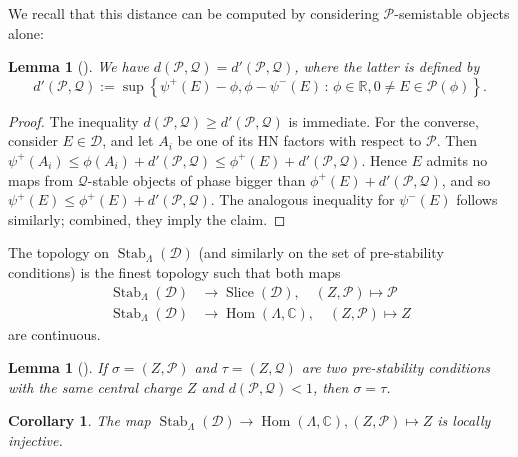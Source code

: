 \documentclass[leqno,11pt,twoside]{amsart}
\makeatletter
\newtheorem*{rep@theorem}{{Conjecture} \ref##}
\newtheorem{Lem}[Thm]{Lemma}
\newtheorem{Cor}[Thm]{Corollary}
{\newenvironment{rep{Cor}}[1]{ } \begin{rep@theorem}} \end{rep@theorem}}
\theoremstyle{definition}
\makeatother
\begin{document}
We recall that this distance can be computed by considering ${\ensuremath{\mathcal P}}$-semistable objects alone:
\begin{Lem}[{\cite[Lemma 6.1]{Bridgeland:Stab}}] \label{lem:distviasemistables}
We have $d({\ensuremath{\mathcal P}}, {\ensuremath{\mathcal Q}}) = d'({\ensuremath{\mathcal P}}, {\ensuremath{\mathcal Q}})$, where the latter is defined by
\[ d'({\ensuremath{\mathcal P}}, {\ensuremath{\mathcal Q}}) := \sup {\left\{{\psi^+(E) - \phi, \phi - \psi^-(E)}\,\colon\,{\phi \in {\ensuremath{\mathbb{R}}}, 0 \neq E \in {\ensuremath{\mathcal P}}(\phi)}\right\}}.\]
\end{Lem}
\begin{proof}
The inequality $d({\ensuremath{\mathcal P}}, {\ensuremath{\mathcal Q}}) \ge d'({\ensuremath{\mathcal P}}, {\ensuremath{\mathcal Q}})$ is immediate. For the converse,
consider $E \in {\ensuremath{\mathcal D}}$, and let $A_i$ be one of its HN factors with respect to ${\ensuremath{\mathcal P}}$.
Then $\psi^+(A_i) \le \phi(A_i) + d'({\ensuremath{\mathcal P}}, {\ensuremath{\mathcal Q}}) \le \phi^+(E) + d'({\ensuremath{\mathcal P}}, {\ensuremath{\mathcal Q}})$. 
Hence $E$ admits no maps from ${\ensuremath{\mathcal Q}}$-stable objects
of phase bigger than $\phi^+(E) + d'({\ensuremath{\mathcal P}}, {\ensuremath{\mathcal Q}})$, and so $\psi^+(E) \le \phi^+(E) + d'({\ensuremath{\mathcal P}}, {\ensuremath{\mathcal Q}})$. 
The analogous inequality for $\psi^-(E)$ follows similarly; combined, they imply the claim.
\end{proof}

The topology on ${\mathop{\mathrm{Stab}}\nolimits}_{\Lambda}({\ensuremath{\mathcal D}})$ (and similarly on the set of pre-stability conditions)
is the finest topology such that both maps
\begin{align*}
{\mathop{\mathrm{Stab}}\nolimits}_{\Lambda}({\ensuremath{\mathcal D}}) & \to {\mathop{\mathrm{Slice}}\nolimits}({\ensuremath{\mathcal D}}),  \quad (Z, {\ensuremath{\mathcal P}}) \mapsto {\ensuremath{\mathcal P}} \\
{\mathop{\mathrm{Stab}}\nolimits}_{\Lambda}({\ensuremath{\mathcal D}}) & \to {\mathop{\mathrm{Hom}}\nolimits}(\Lambda, {\ensuremath{\mathbb{C}}}),  \quad (Z, {\ensuremath{\mathcal P}}) \mapsto Z 
\end{align*}
are continuous.

\begin{Lem}[{\cite[Lemma 6.4]{Bridgeland:Stab}}] \label{lem:locallyinjective}
If $\sigma = (Z, {\ensuremath{\mathcal P}})$ and $\tau = (Z, {\ensuremath{\mathcal Q}})$ are two pre-stability conditions with the same central charge
$Z$ and $d({\ensuremath{\mathcal P}}, {\ensuremath{\mathcal Q}}) < 1$,  then $\sigma = \tau$.
\end{Lem}
\begin{Cor} \label{cor:locallyinjective}
The  map ${\mathop{\mathrm{Stab}}\nolimits}_{\Lambda}({\ensuremath{\mathcal D}}) \to {\mathop{\mathrm{Hom}}\nolimits}(\Lambda, {\ensuremath{\mathbb{C}}}), (Z, {\ensuremath{\mathcal P}}) \mapsto Z$ is locally injective.
\end{Cor}
\end{document}
